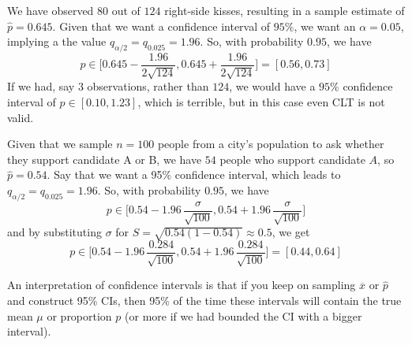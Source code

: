   \begin{example}
    We have observed $80$ out of $124$ right-side kisses, resulting in a sample estimate of $\widehat{p} = 0.645$. Given that we want a confidence interval of $95\%$, we want an $\alpha = 0.05$, implying a the value $q_{\alpha/2} = q_{0.025} = 1.96$. So, with probability $0.95$, we have 
    \begin{equation}
      p \in \bigg[ 0.645 - \frac{1.96}{2 \sqrt{124}}, 0.645 + \frac{1.96}{2 \sqrt{124}} \bigg] = [ 0.56, 0.73 ]
    \end{equation}
    If we had, say $3$ observations, rather than $124$, we would have a $95\%$ confidence interval of $p \in [0.10, 1.23]$, which is terrible, but in this case even CLT is not valid. 
  \end{example}

  \begin{example}
    Given that we sample $n = 100$ people from a city's population to ask whether they support candidate A or B, we have $54$ people who support candidate $A$, so $\widehat{p} = 0.54$. Say that we want a 95\% confidence interval, which leads to $q_{\alpha /2} = q_{0.025} = 1.96$. So, with probability $0.95$, we have 
    \begin{equation}
      p \in \bigg[ 0.54 - 1.96\,\frac{\sigma}{\sqrt{100}}, 0.54 + 1.96\,\frac{\sigma}{\sqrt{100}} \bigg]
    \end{equation}
    and by substituting $\sigma$ for $S = \sqrt{0.54 (1 - 0.54)} \approx 0.5$, we get 
    \begin{equation}
      p \in \bigg[ 0.54 - 1.96\,\frac{0.284}{\sqrt{100}}, 0.54 + 1.96\,\frac{0.284}{\sqrt{100}} \bigg] = [0.44, 0.64]
    \end{equation}
  \end{example}

  An interpretation of confidence intervals is that if you keep on sampling $\overline{x}$ or $\widehat{p}$ and construct 95\% CIs, then 95\% of the time these intervals will contain the true mean $\mu$ or proportion $p$ (or more if we had bounded the CI with a bigger interval). 


